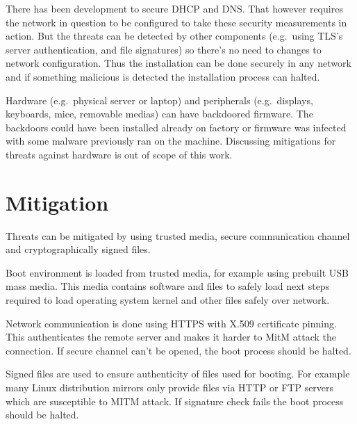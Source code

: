 There has been development to secure DHCP and DNS. That however
requires the network in question to be configured to take these
security measurements in action. But the threats can be detected by
other components (e.g.\ using TLS's server authentication, and file
signatures) so there's no need to changes to network
configuration. Thus the installation can be done securely in any
network and if something malicious is detected the installation
process can halted.

Hardware (e.g.\ physical server or laptop) and peripherals (e.g.\
displays, keyboards, mice, removable medias) can have backdoored
firmware. The backdoors could have been installed already on factory
or firmware was infected with some malware previously ran on the
machine. Discussing mitigations for threats against hardware is out of
scope of this work.


\section{Mitigation}

Threats can be mitigated by using trusted media, secure communication
channel and cryptographically signed files.

Boot environment is loaded from trusted media, for example using
prebuilt USB mass media. This media contains software and files to
safely load next steps required to load operating system kernel and
other files safely over network.

Network communication is done using HTTPS with X.509 certificate
pinning. This authenticates the remote server and makes it harder to
MitM attack the connection. If secure channel can't be opened, the
boot process should be halted.

Signed files are used to ensure authenticity of files used for
booting. For example many Linux distribution mirrors only provide
files via HTTP or FTP servers which are susceptible to MITM attack. If
signature check fails the boot process should be halted.
